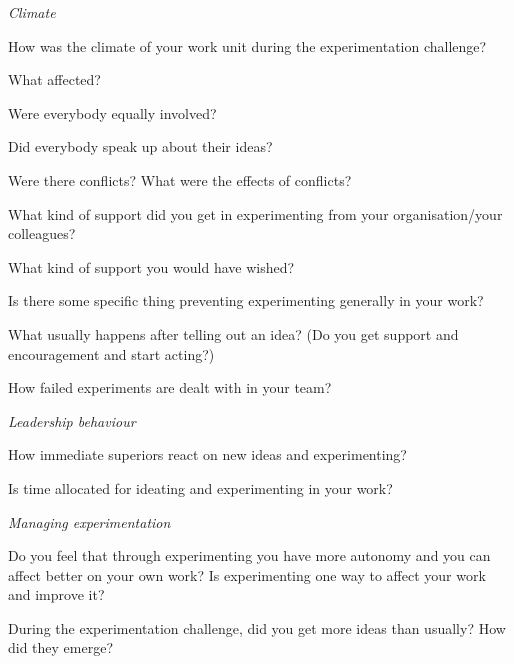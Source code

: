 \noindent\emph{Climate}
\vspace{-3mm} 
\begin{list}{*}{}
\setlength{\itemsep}{-3pt}
    \item How was the climate of your work unit during the experimentation challenge?
    \item What affected?
    \item Were everybody equally involved?
    \item Did everybody speak up about their ideas? 
    \item Were there conflicts? What were the effects of conflicts?
    \item What kind of support did you get in experimenting from your organisation/your colleagues? 
    \item What kind of support you would have wished?
    \item Is there some specific thing preventing experimenting generally in your work?
    \item What usually happens after telling out an idea? (Do you get support and encouragement and start acting?)
    \item How failed experiments are dealt with in your team? 
\end{list}

\noindent\emph{Leadership behaviour}
\vspace{-3mm} 
\begin{list}{*}{}
\setlength{\itemsep}{-3pt}
    \item How immediate superiors react on new ideas and experimenting?
    \item Is time allocated for ideating and experimenting in your work?
    \end{list}
    
\noindent\emph{Managing experimentation}
\vspace{-3mm} 
\begin{list}{*}{}
\setlength{\itemsep}{-3pt}
     \item  Do you feel that through experimenting you have more autonomy and you can affect better on your own work? Is experimenting one way to affect your work and improve it? 
    \item During the experimentation challenge, did you get more ideas than usually? How did they emerge?
    
\end{list}

